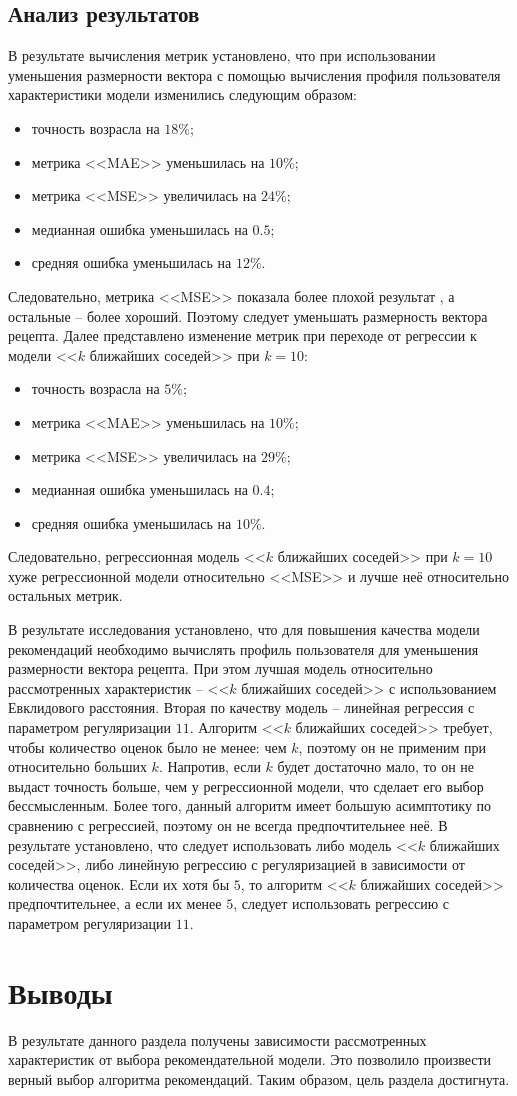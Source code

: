 \subsection{Анализ результатов}
В результате вычисления метрик установлено, что при использовании уменьшения размерности вектора с помощью вычисления профиля пользователя характеристики модели изменились следующим образом:
\begin{itemize}
	\item точность возрасла на $18 \%$;
	\item метрика <<MAE>> уменьшилась на $10\%$;
	\item метрика <<MSE>> увеличилась на $24\%$;
	\item медианная ошибка уменьшилась на $0{.}5$;
	\item средняя ошибка уменьшилась на $12\%$.
\end{itemize}
Следовательно, метрика <<MSE>> показала более плохой результат , а остальные -- более хороший.
Поэтому следует уменьшать размерность вектора рецепта.
Далее представлено изменение метрик при переходе от регрессии к модели <<$k$ ближайших соседей>> при $k = 10$:
\begin{itemize}
	\item точность возрасла на $5 \%$;
	\item метрика <<MAE>> уменьшилась на $10\%$;
	\item метрика <<MSE>> увеличилась на $29\%$;
	\item медианная ошибка уменьшилась на $0{.}4$;
	\item средняя ошибка уменьшилась на $10\%$.
\end{itemize}
Следовательно, регрессионная модель  <<$k$ ближайших соседей>> при $k = 10$ хуже регрессионной модели относительно <<MSE>> и лучше неё относительно остальных метрик.

В результате исследования установлено, что для повышения качества модели рекомендаций необходимо вычислять профиль пользователя для уменьшения размерности вектора рецепта.
При этом лучшая модель относительно рассмотренных характеристик -- <<$k$ ближайших соседей>> с использованием Евклидового расстояния.
Вторая по качеству модель -- линейная регрессия с параметром регуляризации $11$.
Алгоритм <<$k$ ближайших соседей>> требует, чтобы количество оценок было не менее: чем $k$, поэтому он не применим при относительно больших $k$.
Напротив, если $k$ будет достаточно мало, то он не выдаст точность больше, чем у регрессионной модели, что сделает его выбор бессмысленным.
Более того, данный алгоритм имеет большую асимптотику по сравнению с регрессией, поэтому он не всегда предпочтительнее неё.
В результате установлено, что следует использовать либо модель <<$k$ ближайших соседей>>, либо линейную регрессию с регуляризацией в зависимости от количества оценок.
Если их хотя бы $5$, то алгоритм <<$k$ ближайших соседей>> предпочтительнее, а если их менее $5$, следует использовать регрессию с параметром регуляризации $11$.

\section*{Выводы}
В результате данного раздела получены зависимости рассмотренных характеристик от выбора рекомендательной модели.
Это позволило произвести верный выбор алгоритма рекомендаций.
Таким образом, цель раздела достигнута.

